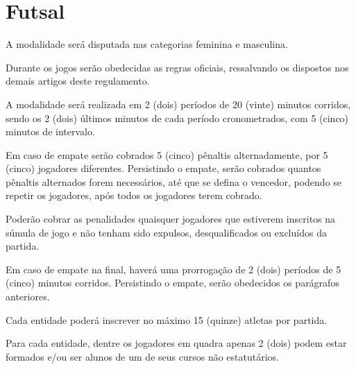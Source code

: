 {\let\clearpage\relax \chapter{Futsal}}

\begin{article}
	A modalidade será disputada nas categorias feminina e masculina.
\end{article}

\begin{article}
	Durante os jogos serão obedecidas as regras oficiais, ressalvando os dispostos nos demais artigos deste regulamento.
\end{article}

\begin{article}
	A modalidade será realizada em 2 (dois) períodos de 20 (vinte) minutos corridos, sendo os 2 (dois) últimos minutos de cada período cronometrados, com 5 (cinco) minutos de intervalo.

	\begin{xparagraph}
		Em caso de empate serão cobrados 5 (cinco) pênaltis alternadamente, por 5 (cinco) jogadores diferentes. Persistindo o empate, serão cobrados quantos pênaltis alternados forem necessários, até que se defina o vencedor, podendo se repetir os jogadores, após todos os jogadores terem cobrado.
	\end{xparagraph}

	\begin{xparagraph}
		Poderão cobrar as penalidades quaisquer jogadores que estiverem inscritos na súmula de jogo e não tenham sido expulsos, desqualificados ou excluídos da partida.
	\end{xparagraph}

	\begin{xparagraph}
		Em caso de empate na final, haverá uma prorrogação de 2 (dois) períodos de 5 (cinco) minutos corridos. Persistindo o empate, serão obedecidos os parágrafos anteriores.
	\end{xparagraph}
\end{article}

\begin{article}
	Cada entidade poderá inscrever no máximo 15 (quinze) atletas por partida.
\end{article}

\begin{article}
	Para cada entidade, dentre os jogadores em quadra apenas 2 (dois) podem estar formados e/ou ser alunos de um de seus cursos não estatutários.
\end{article}
